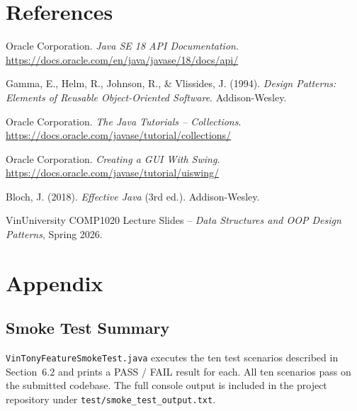 \documentclass[11pt,a4paper]{article}
\begin{document}
\section{References}
\begin{enumerate}[label={[\arabic*]},leftmargin=*]
    \item Oracle Corporation. \emph{Java SE 18 API Documentation}. \url{https://docs.oracle.com/en/java/javase/18/docs/api/}
    \item Gamma, E., Helm, R., Johnson, R., \& Vlissides, J. (1994). \emph{Design Patterns: Elements of Reusable Object-Oriented Software}. Addison-Wesley.
    \item Oracle Corporation. \emph{The Java Tutorials -- Collections}. \url{https://docs.oracle.com/javase/tutorial/collections/}
    \item Oracle Corporation. \emph{Creating a GUI With Swing}. \url{https://docs.oracle.com/javase/tutorial/uiswing/}
    \item Bloch, J. (2018). \emph{Effective Java} (3rd ed.). Addison-Wesley.
    \item VinUniversity COMP1020 Lecture Slides -- \emph{Data Structures and OOP Design Patterns}, Spring 2026.
\end{enumerate}

\newpage

\section{Appendix}

\subsection{Smoke Test Summary}
\texttt{VinTonyFeatureSmokeTest.java} executes the ten test scenarios described in Section~6.2 and prints a PASS / FAIL result for each. All ten scenarios pass on the submitted codebase. The full console output is included in the project repository under \texttt{test/smoke\_test\_output.txt}.
\end{document}
